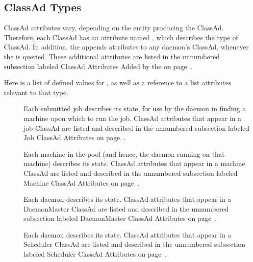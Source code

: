 \subsection*{\label{sec:ClassAd-Types}ClassAd Types}

ClassAd attributes vary, 
depending on the entity producing the ClassAd.
Therefore, each ClassAd has an attribute named ,
which describes the type of ClassAd.
In addition, the  appends attributes to
any daemon's ClassAd, whenever the  is
queried. These additional attributes are listed in
the unnumbered subsection labeled ClassAd Attributes Added by the 
on page~\pageref{sec:Collector-Added-Attributes}.

Here is a list of defined values for ,
as well as a reference to a list attributes relevant to
that type.

\begin{description}
  \item[]
  Each submitted job describes its state, for use by the
   daemon in finding a machine upon which to
  run the job.
  ClassAd attributes that appear in a job ClassAd are listed and described in
  the unnumbered subsection labeled Job ClassAd Attributes
  on page~\pageref{sec:Job-ClassAd-Attributes}.

  \item[]
   Each machine in the pool (and hence, the  daemon running
   on that machine) describes its state.
  ClassAd attributes that appear in a machine ClassAd 
  are listed and described in
  the unnumbered subsection labeled Machine ClassAd Attributes
  on page~\pageref{sec:Machine-ClassAd-Attributes}.

  \item[]
   Each  daemon describes its state.
  ClassAd attributes that appear in a DaemonMaster ClassAd 
  are listed and described in
  the unnumbered subsection labeled DaemonMaster ClassAd Attributes
  on page~\pageref{sec:DaemonMaster-ClassAd-Attributes}.

  \item[]
   Each  daemon describes its state.
  ClassAd attributes that appear in a Scheduler ClassAd 
  are listed and described in
  the unnumbered subsection labeled Scheduler ClassAd Attributes
  on page~\pageref{sec:Scheduler-ClassAd-Attributes}.

  \item[]
  \Todo

  \item[]
  \Todo

\end{description}

